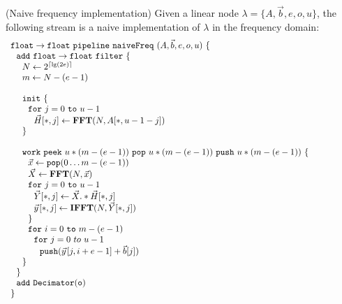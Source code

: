 \begin{transformation} (Naive frequency implementation)
Given a linear node $\lambda = \{A, {\vec b}, e, o, u\}$, the
following stream is a naive implementation of $\lambda$ in the
frequency domain: \\
\begin{equation} \nonumber
  \begin{array}{ll}

    {\tt float \rightarrow float}~{\tt pipeline~naiveFreq~}(A, {\vec b}, e, o, u){\tt ~\{} & \hspace{40pt}\\
    ~~{\tt add~float \rightarrow float~filter~\{}\\
    ~~~~N \leftarrow 2^{\lceil \lg(2e) \rceil} \\
    ~~~~m \leftarrow N-(e-1) \\
    \\
    ~~~~{\tt init}~{\tt \{} \\
    ~~~~~~{\tt for}~j=0~{\tt to}~u-1\\
    ~~~~~~~~\vec{H}[*,j] \leftarrow \mathbf{FFT}(N,A[*,u-1-j]) \\
    ~~~~{\tt \}} \\
    \\
    ~~~~{\tt work}~{\tt peek}~u*(m-(e-1))~{\tt pop}~u*(m-(e-1))~{\tt push}~u*(m-(e-1))~{\tt \{} \\
    ~~~~~~\vec{x} \leftarrow {\tt pop}(0 \dots m - (e-1)) \\
    ~~~~~~\vec{X} \leftarrow \mathbf{FFT} (N, \vec{x}) \\
    ~~~~~~{\tt for}~j=0~{\tt to}~u-1\\
    ~~~~~~~~\vec{Y}[*,j] \leftarrow \vec{X} .* \vec{H}[*,j] \\
    ~~~~~~~~\vec{y}\hspace{1pt}[*,j] \leftarrow \mathbf{IFFT}(N, \vec{Y}[*,j]) \\
    ~~~~~~{\tt \}} \\
    ~~~~~~{\tt for}~i=0~{\tt to}~m-(e-1)\\
    ~~~~~~~~{\tt for}~j=0~to~u-1\\
    ~~~~~~~~~~{\tt push}(\vec{y}\hspace{1pt}[j,i+e-1] + {\vec b}[j])\\
    ~~~~{\tt \}} \\
    ~~{\tt \}} \\
    ~~{\tt add~Decimator(o)} \\
    {\tt \}} \\
  \end{array}
\end{equation}
\label{trans:freq1}
\end{transformation}

